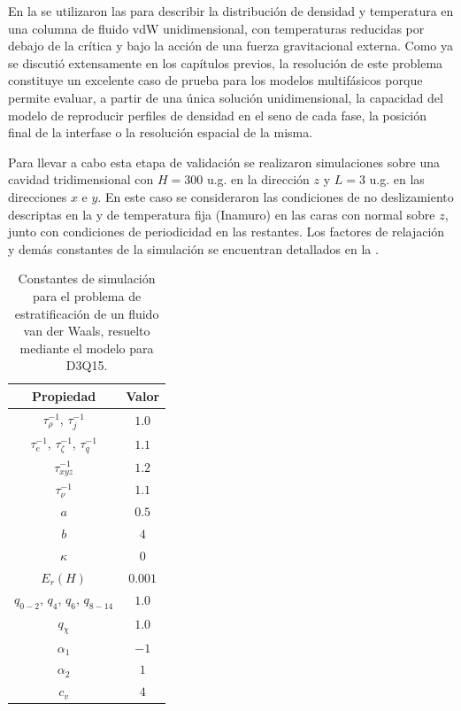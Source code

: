 En la  se utilizaron las  para describir la distribuci\'on de densidad y temperatura en una columna de fluido vdW unidimensional, con temperaturas reducidas por debajo de la cr\'itica y bajo la acci\'on de una fuerza gravitacional externa. Como ya se discuti\'o extensamente en los cap\'itulos previos, la resoluci\'on de este problema constituye un excelente caso de prueba para los modelos multif\'asicos \pps{} porque permite evaluar, a partir de una \'unica soluci\'on unidimensional, la capacidad del modelo de reproducir perfiles de densidad en el seno de cada fase, la posici\'on final de la interfase o la resoluci\'on espacial de la misma.

Para llevar a cabo esta etapa de validaci\'on se realizaron simulaciones sobre una cavidad tridimensional con $H=300$ u.g. en la direcci\'on $z$ y $L=3$ u.g. en las direcciones $x$ e $y$. En este caso se consideraron las condiciones de no deslizamiento descriptas en la  y de temperatura fija (Inamuro) en las caras con normal sobre $z$, junto con condiciones de periodicidad en las restantes. Los factores de relajaci\'on y dem\'as constantes de la simulaci\'on se encuentran detallados en la .

\begin{table}[ht]
	\centering
    \begin{tabular}{c c}
	    \toprule
        \bf Propiedad & \bf Valor \\
        \midrule
        $\tau_{\rho}^{-1}$, $\tau_{j}^{-1}$ & $1.0$ \\
        $\tau_{e}^{-1}$, $\tau_{\zeta}^{-1}$, $\tau_{q}^{-1}$ & $1.1$ \\
        $\tau_{xyz}^{-1}$ & $1.2$ \\
        $\tau_{\nu}^{-1}$ & $1.1$ \\
		$a$ & $0.5$ \\
		$b$ & $4$ \\
		$\kappa$   & 0 \\
		$E_r (H)$  & $0.001$ \\
		$q_{0-2}$, $q_4$, $q_{6}$, $q_{8-14}$ & $1.0$ \\
		$q_{\chi}$ & $1.0$ \\
		$\alpha_1$ & $-1$ \\
		$\alpha_2$ & $1$ \\
		$c_v$      & $4$ \\
        \bottomrule
	\end{tabular}
	\caption{Constantes de simulaci\'on para el problema de estratificaci\'on de un fluido van der Waals, resuelto mediante el modelo para D3Q15.}
	\label{tab:vdwColumn3D_prop}
\end{table}  

